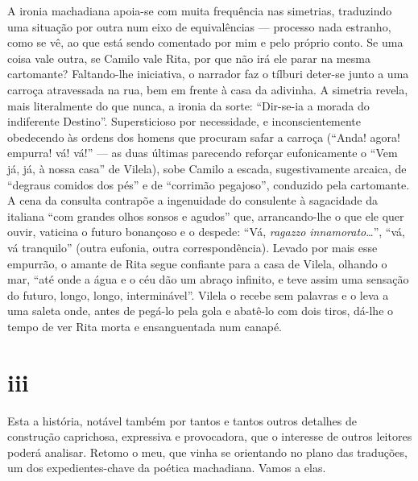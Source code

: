 A ironia machadiana apoia-se com muita frequência nas simetrias,
traduzindo uma situação por outra num eixo de equivalências --- processo
nada estranho, como se vê, ao que está sendo comentado por mim e pelo
próprio conto. Se uma coisa vale outra, se Camilo vale Rita, por que não
irá ele parar na mesma cartomante? Faltando-lhe iniciativa, o narrador
faz o tílburi deter-se junto a uma carroça atravessada na rua, bem em
frente à casa da adivinha. A simetria revela, mais literalmente do que
nunca, a ironia da sorte: ``Dir-se-ia a morada do indiferente Destino''.
Supersticioso por necessidade, e inconscientemente obedecendo às ordens
dos homens que procuram safar a carroça (``Anda! agora! empurra! vá!
vá!'' --- as duas últimas parecendo reforçar eufonicamente o ``Vem já,
já, à nossa casa'' de Vilela), sobe Camilo a escada, sugestivamente
arcaica, de ``degraus comidos dos pés'' e de ``corrimão pegajoso'',
conduzido pela cartomante. A cena da consulta contrapõe a ingenuidade do
consulente à sagacidade da italiana ``com grandes olhos sonsos e
agudos'' que, arrancando-lhe o que ele quer ouvir, vaticina o futuro
bonançoso e o despede: ``Vá, \emph{ragazzo innamorato}\ldots{}'', ``vá,
vá tranquilo'' (outra eufonia, outra correspondência). Levado por mais
esse empurrão, o amante de Rita segue confiante para a casa de Vilela,
olhando o mar, ``até onde a água e o céu dão um abraço infinito, e teve
assim uma sensação do futuro, longo, longo, interminável''. Vilela o
recebe sem palavras e o leva a uma saleta onde, antes de pegá-lo pela
gola e abatê-lo com dois tiros, dá-lhe o tempo de ver Rita morta e
ensanguentada num canapé.

\section*{iii}

Esta a história, notável também por tantos e tantos outros detalhes de
construção caprichosa, expressiva e provocadora, que o interesse de
outros leitores poderá analisar. Retomo o meu, que vinha se orientando
no plano das traduções, um dos expedientes-chave da poética machadiana.
Vamos a elas.

